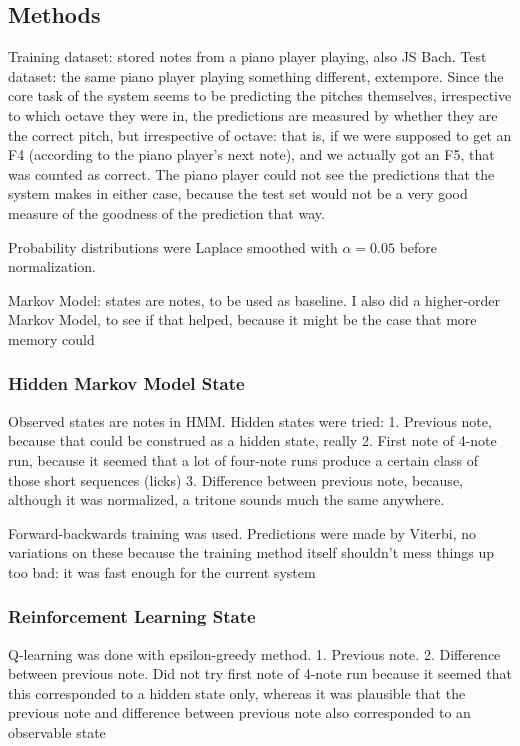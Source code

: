 \documentclass{article}
\begin{document}
\subsection*{Methods}
Training dataset: stored notes from a piano player playing, also JS Bach.
Test dataset: the same piano player playing something different, extempore. Since the core task of the system seems to be predicting the pitches themselves, irrespective to which octave they were in, the predictions are measured by whether they are the correct pitch, but irrespective of octave: that is, if we were supposed to get an F4 (according to the piano player's next note), and we actually got an F5, that was counted as correct.
The piano player could not see the predictions that the system makes in either case, because the test set would not be a very good measure of the goodness of the prediction that way.

Probability distributions were Laplace smoothed with $\alpha = 0.05$ before normalization.

Markov Model: states are notes, to be used as baseline. I also did a higher-order Markov Model, to see if that helped, because it might be the case that more memory could 

\subsubsection*{Hidden Markov Model State}
Observed states are notes in HMM.
Hidden states were tried:
1. Previous note, because that could be construed as a hidden state, really
2. First note of 4-note run, because it seemed that a lot of four-note runs produce a certain class of those short sequences (licks)
3. Difference between previous note, because, although it was normalized, a tritone sounds much the same anywhere.

Forward-backwards training was used. Predictions were made by Viterbi, no variations on these because the training method itself shouldn't mess things up too bad: it was fast enough for the current system

\subsubsection*{Reinforcement Learning State}
Q-learning was done with epsilon-greedy method.
1. Previous note.
2. Difference between previous note.
Did not try first note of 4-note run because it seemed that this corresponded to a hidden state only, whereas it was plausible that the previous note and difference between previous note also corresponded to an observable state
\end{document}
